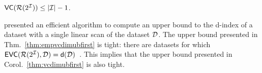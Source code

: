 \begin{corollary}\label{thm:vcdimubfirst}
  $\mathsf{VC}(\mathcal{R}(2^{\cal I}))\le |{\cal I}|-1$.
\end{corollary}

\citet{RiondatoU14} presented an efficient algorithm to compute an upper bound to
the d-index of a dataset with a single linear scan of the dataset ${\cal D}$.
The upper bound presented in Thm.~\ref{thm:empvcdimubfirst} is tight: there are
datasets for which
$\mathsf{EVC}(\mathcal{R}(2^{\cal I}),{\cal D})=\mathsf{d}({\cal D})$~\citep{RiondatoU14}. This implies
that the upper bound presented in Corol.~\ref{thm:vcdimubfirst} is also tight.
